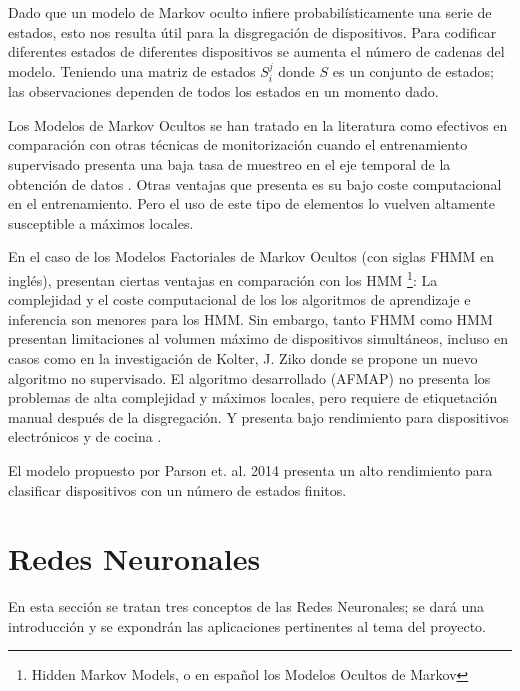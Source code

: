 Dado que un modelo de Markov oculto infiere probabilísticamente una serie de estados, esto nos resulta útil para la disgregación de dispositivos. Para codificar diferentes estados de diferentes dispositivos se aumenta el número de cadenas del modelo. Teniendo una matriz de estados $S_i^j$ donde $S$ es un conjunto de estados; las observaciones dependen de todos los estados en un momento dado.

Los Modelos de Markov Ocultos se han tratado en la literatura como efectivos en comparación con otras técnicas de monitorización cuando el entrenamiento supervisado presenta una baja tasa de muestreo en el eje temporal de la obtención de datos \autocite{frenchHMMNILM}.
Otras ventajas que presenta es su bajo coste computacional en el entrenamiento. Pero el uso de este tipo de elementos lo vuelven altamente susceptible a máximos locales\autocite{NILMreview2017}.

En el caso de los Modelos Factoriales de Markov Ocultos (con siglas FHMM en inglés), presentan ciertas ventajas en comparación con los HMM \footnote{Hidden Markov Models, o en español los Modelos Ocultos de Markov}:
La complejidad y el coste computacional de los los algoritmos de aprendizaje e inferencia son menores para los HMM. Sin embargo, tanto FHMM como HMM presentan limitaciones al volumen máximo de dispositivos simultáneos, incluso en casos como en la investigación de Kolter, J. Ziko \autocite{afmap2012} donde se propone un nuevo algoritmo no supervisado. El algoritmo desarrollado (AFMAP) no presenta los problemas de alta complejidad y máximos locales, pero requiere de etiquetación manual después de la disgregación. Y presenta bajo rendimiento para dispositivos electrónicos y de cocina \autocite[5]{NILMreview2017}.

El modelo propuesto por Parson et. al. 2014 \autocite{PARSON20141} presenta un alto rendimiento para clasificar dispositivos con un número de estados finitos.


\section{Redes Neuronales}
\label{RN}

En esta sección se tratan tres conceptos de las Redes Neuronales; se dará una introducción y se expondrán las aplicaciones pertinentes al tema del proyecto.
